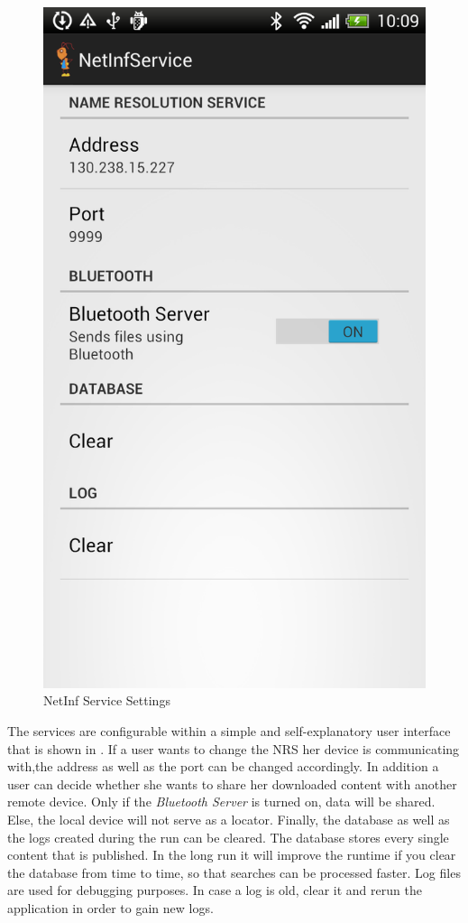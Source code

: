 \begin{figure}
\centering
\includegraphics[scale=0.15]{img/ant_settings.png}
\caption{NetInf Service Settings}\label{fig:servicesettings}
\end{figure}

The services are configurable within a simple and self-explanatory user interface that is shown in .
If a user wants to change the NRS her device is communicating with,the address as well as the port can be changed accordingly.
In addition a user can decide whether she wants to share her downloaded content with another remote device. Only if the \textit{Bluetooth Server} 
is turned on, data will be shared. Else, the local device will not serve as a locator.
Finally, the database as well as the logs created during the run can be cleared.
The database stores every single content that is published. In the long run it will improve the runtime if you clear the database from
time to time, so that searches can be processed faster.
Log files are used for debugging purposes. In case a log is old, clear it and rerun the application in order to 
gain new logs.





